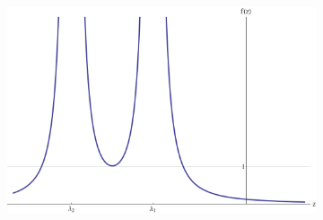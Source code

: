 \documentclass[12pt]{article}
\begin{document}
\begin{figure}[h]
\centering
 \begin{subfigure}[b]{0.4\textwidth}
 	 \includegraphics[width=\textwidth]{grafica_lambas_negativas.png}
 	 \caption{}
 	 \label{fig:lamdas_negativas}
 \end{subfigure}
 

\end{figure}
\end{document}
